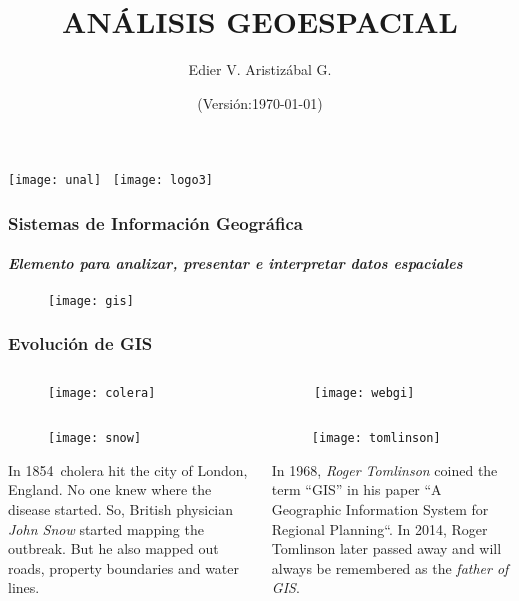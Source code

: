 \documentclass[14pt]{beamer}
\title[GIS]{ANÁLISIS GEOESPACIAL}
\author[Edier Aristizábal]{Edier V. Aristizábal G.}
\institute{\emph{evaristizabalg@unal.edu.co}}
\date{\tiny{(Versión:\today)}}
\begin{document}
\begin{frame}
\titlepage
\centering
	\texttt{[image: unal]}\hspace*{4.75cm}~%
   	\texttt{[image: logo3]}
\end{frame}
\begin{frame}
\frametitle{Sistemas de Información Geográfica}
\framesubtitle{\emph {Elemento para analizar, presentar e interpretar datos espaciales}}
  \begin{figure}
    \centering
    \texttt{[image: gis]}
  \end{figure}
\end{frame}
\begin{frame}\frametitle{Evolución de GIS}
\begin{columns}
		\begin{column}{.48\linewidth}
			\begin{figure}
				\texttt{[image: colera]}\\
			\end{figure}
		\end{column}
		\begin{column}{.48\linewidth}
			\begin{figure}
				\texttt{[image: webgi]}\\
			\end{figure}
		\end{column}
	\end{columns}
	\begin{columns}
		\begin{column}{.48\linewidth}
			\begin{figure}
				\texttt{[image: snow]}\\
			\end{figure}
\scriptsize{In 1854\, cholera hit the city of London, England. No one knew where the disease started. So, British physician \emph{John Snow} started mapping the outbreak. But he also mapped out roads, property boundaries and water lines.}
		\end{column}
		\begin{column}{.48\linewidth}
			\begin{figure}
				\texttt{[image: tomlinson]}\\
			\end{figure}
\scriptsize{In 1968, \emph{Roger Tomlinson} coined the term “GIS” in his paper “A Geographic Information System for Regional Planning“. In 2014, Roger Tomlinson later passed away and will always be remembered as the \emph{father of GIS}.}
		\end{column}
	\end{columns}
\end{frame}
\end{document}
